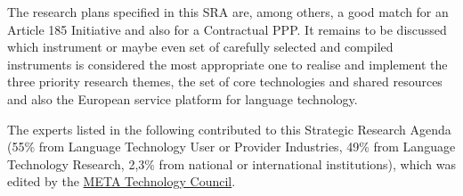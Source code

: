 \documentclass[10pt, plain]{../../metanetpaper}
\begin{document}
\begin{multicols}{2}
The research plans specified in this SRA are, among others, a good match for an Article 185 Initiative and also for a Contractual PPP. It remains to be discussed which instrument or maybe even set of carefully selected and compiled instruments is considered the most appropriate one to realise and implement the three priority research themes, the set of core technologies and shared resources and also the European service platform for language technology.


\end{multicols}

\clearpage


\appendix
{}





\clearpage


\label{sec:list-of-contributors}

The experts listed in the following contributed to this Strategic Research Agenda (55\% from Language Technology User or Provider Industries, 49\% from Language Technology Research, 2,3\% from national or international institutions), which was edited by the \href{http://www.meta-net.eu/vision/technology-council-members/all}{META Technology Council}.
\end{document}
